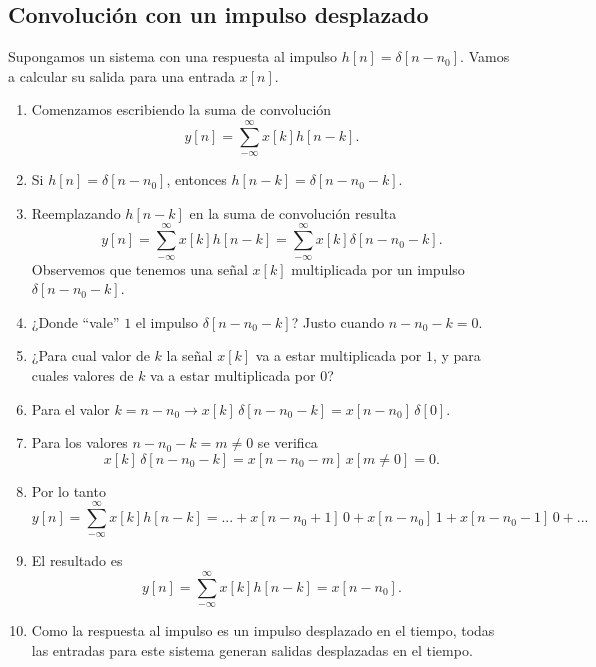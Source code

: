 \subsection{Convolución con un impulso desplazado}

Supongamos un sistema con una respuesta al impulso $h[n] = \delta[n - n_{0}]$. Vamos a calcular su salida
para una entrada $x[n]$.

\begin{enumerate}
 \item Comenzamos escribiendo la suma de convolución
   \begin{equation}
    y\left[ n\right] = \sum_{-\infty }^{\infty }x\left[ k\right] h\left[ n-k\right] .
  \end{equation}
 \item Si $h[n] = \delta[n - n_{0}]$, entonces $h[n - k] = \delta[n - n_{0} - k]$.
 \item Reemplazando $h[n - k]$ en la suma de convolución resulta
   \begin{equation}
    y\left[ n\right] = \sum_{-\infty }^{\infty }x\left[ k\right] h\left[ n-k\right] =
    \sum_{-\infty }^{\infty }x\left[ k\right] \delta\left[ n- n_{0} -k\right].
  \end{equation}
  Observemos que tenemos una señal $x[k]$ multiplicada por un impulso $\delta\left[ n- n_{0} -k\right]$.
  \item ¿Donde ``vale'' $1$ el impulso $\delta\left[ n- n_{0} -k\right]$? Justo cuando
  $n- n_{0} -k = 0$.
  \item ¿Para cual valor de $k$ la señal $x[k]$ va a estar multiplicada por $1$, y para cuales valores de
  $k$ va a estar multiplicada por $0$?
  \item Para el valor $k = n - n_{0} \rightarrow x[k] \, \delta\left[ n- n_{0} -k\right] = x[n - n_{0}] \, \delta[0]$.
  \item Para los valores $n - n_{0} - k = m \neq 0$ se verifica 
  \begin{equation}x[k] \, \delta\left[n - n_{0} -k\right] = 
  x[n - n_{0} - m] \, x[m \neq 0] = 0.\end{equation}
  \item Por lo tanto
   \begin{equation}
    y\left[ n\right] = \sum_{-\infty }^{\infty }x\left[ k\right] h\left[ n-k\right] =
    ... + x[n - n_{0} + 1] \, 0 + x[n - n_{0}] \, 1 + x[n - n_{0} -1] \, 0 + ... 
  \end{equation}
  \item El resultado es
   \begin{equation}
    y\left[ n\right] = \sum_{-\infty }^{\infty }x\left[ k\right] h\left[ n-k\right] = x[n - n_{0}].
  \end{equation}
  \item Como la respuesta al impulso es un impulso desplazado en el tiempo, todas las entradas para este sistema generan salidas desplazadas en el tiempo.
  \end{enumerate}

